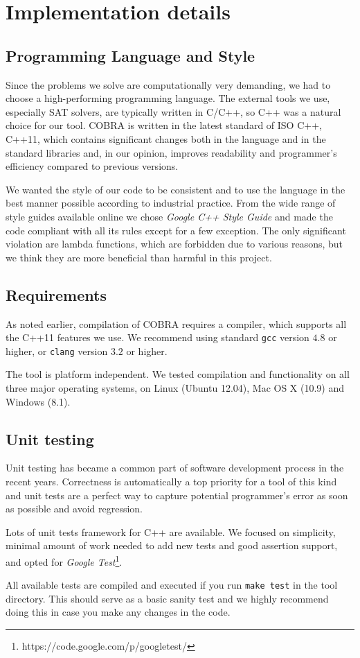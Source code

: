 \section{Implementation details}

\subsection{Programming Language and Style}

Since the problems we solve are computationally very demanding,
  we had to choose a high-performing programming language.
The external tools we use, especially SAT solvers, are typically written in C/C++,
  so C++ was a natural choice for our tool.
COBRA is written in the latest standard of ISO C++, C++11, which
  contains significant changes both in the language and in the standard libraries
  and, in our opinion, improves readability and programmer's efficiency
  compared to previous versions.

We wanted the style of our code to be consistent and to use
  the language in the best manner possible according to industrial practice.
From the wide range of style guides available online
 we chose \emph{Google C++ Style Guide}\cite{googlestyle} and made
 the code compliant with all its rules except for a few exception.
The only significant violation are lambda functions, which are forbidden
due to various reasons,
 but we think they are more beneficial than harmful in this project.

\subsection{Requirements}
As noted earlier, compilation of COBRA requires a compiler,
  which supports all the C++11 features we use.
We recommend using standard \texttt{gcc} version $4.8$ or higher, or
 \texttt{clang} version $3.2$ or higher.

The tool is platform independent.
  We tested compilation and functionality on
  all three major operating systems, on Linux (Ubuntu 12.04),
  Mac OS X (10.9) and Windows (8.1).

\subsection{Unit testing}
Unit testing has became a common part of software development process
  in the recent years.
Correctness is automatically a top priority for a tool of this kind and
  unit tests are a perfect way to capture potential programmer's error
  as soon as possible and avoid regression.

Lots of unit tests framework for C++ are available.
We focused on simplicity, minimal amount of work needed to add new tests
  and good assertion support, and opted for
  \emph{Google Test}\footnote{https://code.google.com/p/googletest/}.

All available tests are compiled and executed if you run \texttt{make test}
  in the tool directory.
This should serve as a basic sanity test and we highly recommend
  doing this in case you make any changes in the code.

